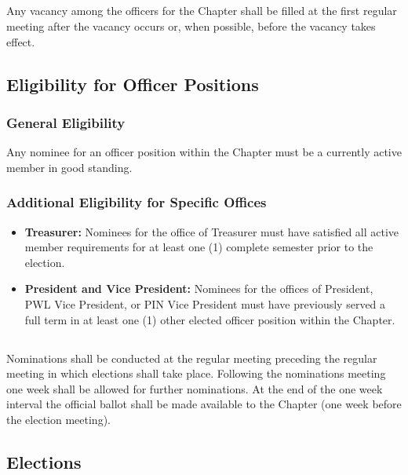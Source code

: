 \documentclass[10pt, oneside]{article}
\begin{document}
\subsection{}
Any vacancy among the officers for the Chapter shall be filled at the first regular meeting after the vacancy occurs or, when possible, before the vacancy takes effect.

\subsection{Eligibility for Officer Positions}\label{OfficerReq}
\subsubsection{General Eligibility}
Any nominee for an officer position within the Chapter must be a currently active member in good standing.

\subsubsection{Additional Eligibility for Specific Offices}
\begin{itemize}
    \item \textbf{Treasurer:} Nominees for the office of Treasurer must have satisfied all active member requirements for at least one (1) complete semester prior to the election.
    \item \textbf{President and Vice President:} Nominees for the offices of President, PWL Vice President, or PIN Vice President must have previously served a full term in at least one (1) other elected officer position within the Chapter.
\end{itemize}

\subsection{}
Nominations shall be conducted at the regular meeting preceding the regular meeting in which elections shall take place. Following the nominations meeting one week shall be allowed for further nominations. At the end of the one week interval the official ballot shall be made available to the Chapter (one week before the election meeting).

\subsection{Elections}
\end{document}
